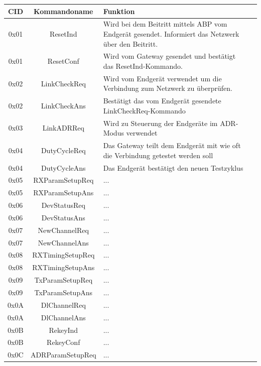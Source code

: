 \documentclass[a4paper, 12pt]{article}
\begin{document}
                    
                \begin{longtable}{c |c | p{10.5cm} c}
                    CID & Kommandoname & Funktion \\
                    \hline
                    0x01 & ResetInd & Wird bei dem Beitritt mittels ABP vom Endgerät gesendet. Informiert das Netzwerk über den Beitritt. \\
                    0x01 & ResetConf & Wird vom Gateway gesendet und bestätigt das ResetInd-Kommando. \\
                    0x02 & LinkCheckReq & Wird vom Endgerät verwendet um die Verbindung zum Netzwerk zu überprüfen. \\
                    0x02 & LinkCheckAns & Bestätigt das vom Endgerät gesendete LinkCheckReq-Kommando \\
                    0x03 & LinkADRReq & Wird zu Steuerung der Endgeräte im ADR-Modus verwendet \\
                    0x04 & DutyCycleReq & Das Gateway teilt dem Endgerät mit wie oft die Verbindung getestet werden soll \\
                    0x04 & DutyCycleAns & Das Endgerät bestätigt den neuen Testzyklus \\
                    0x05 & RXParamSetupReq & ... \\
                    0x05 & RXParamSetupAns & ... \\
                    0x06 & DevStatusReq & ... \\
                    0x06 & DevStatusAns & ... \\
                    0x07 & NewChannelReq & ... \\
                    0x07 & NewChannelAns & ... \\
                    0x08 & RXTimingSetupReq & ... \\
                    0x08 & RXTimingSetupAns & ... \\
                    0x09 & TxParamSetupReq & ... \\
                    0x09 & TxParamSetupAns & ... \\
                    0x0A & DlChannelReq & ... \\
                    0x0A & DlChannelAns & ... \\
                    0x0B & RekeyInd & ... \\
                    0x0B & RekeyConf & ... \\
                    0x0C & ADRParamSetupReq & ... \\

\end{longtable}
\end{document}

